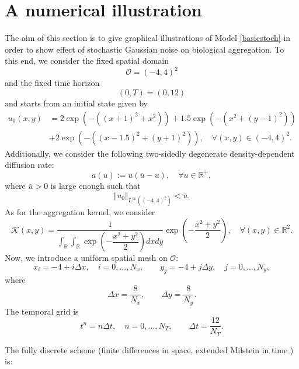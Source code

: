 \documentclass[10pt,number,preprint,times]{elsarticle}
\numberwithin{equation}{section} %
\begin{document}
\section{A numerical illustration}
\label{section8}
The aim of this section is to give graphical illustrations of Model \eqref{basicstoch} in order to show effect of stochastic Gaussian noise on biological aggregation. To this end, we consider the fixed spatial domain
\[
\mathcal{O}=(-4,4)^2
\]
and the fixed time horizon
\[
(0,T)=(0,12)
\]
and starts from an initial state given by 
\begin{align*}
	u_0(x,y)&=2\exp(-((x+1)^2 +x^2))+1.5\exp(-(x^2+(y-1)^2))\\
	&+2\exp(-((x-1.5)^2+(y+ 1)^2)), \quad \forall (x,y) \in (-4,4)^2.
\end{align*}
Additionally, we consider the following two-sidedly degenerate density-dependent diffusion rate:
$$
a(u):=u(\overline{u}-u), \quad \forall u \in \mathbb{R}^+,
$$
where $\overline{u}>0$ is large enough such that 
$$\Vert u_0 \Vert_{L^\infty((-4,4)^2)} < \overline{u}.$$
As for the aggregation kernel, we consider
$$
\mathcal{K}(x,y)=\dfrac{1}{\displaystyle \int_{\mathbb{R}} \int_{\mathbb{R}} \exp(-\dfrac{x^2+y^2}{2}) dx dy}\exp(-\dfrac{x^2+y^2}{2}), \quad \forall (x,y)\in \mathbb{R}^2. 
$$
\noindent
Now, we introduce a uniform spatial mesh on \(\mathcal{O}\):
\[
x_i = -4 + i\Delta x, \quad i=0,\dots,N_x,
\qquad
y_j = -4 + j\Delta y, \quad j=0,\dots,N_y,
\]
where
\[
\Delta x = \frac{8}{N_x}, \qquad \Delta y = \frac{8}{N_y}.
\]
The temporal grid is
\[
t^n = n\Delta t, \quad n=0,\dots,N_T, 
\qquad \Delta t = \frac{12}{N_T}.
\]

\noindent
The fully discrete scheme (finite differences in space, extended Milstein in time \cite{hu2022stability}) is:
\end{document}
